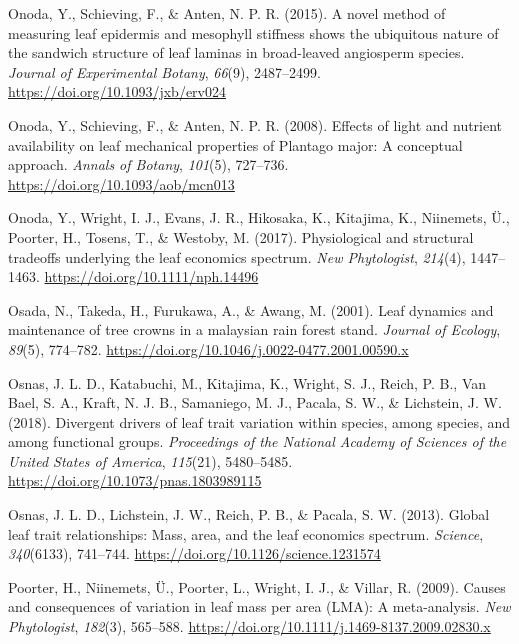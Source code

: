 \documentclass[
  12pt,
  a4paper,
,tablecaptionabove
]{scrartcl}
\newlength{\cslhangindent}
\newenvironment{CSLReferences}[2] %
 {%
  \setlength{\parindent}{0pt}
  \ifodd #1 \everypar{\setlength{\hangindent}{\cslhangindent}}\ignorespaces\fi
  \ifnum #2 > 0
  \setlength{\parskip}{#2\baselineskip}
  \fi
 }%
 {}
\begin{document}
\begin{CSLReferences}{1}{0}
\leavevmode{}%
Onoda, Y., Schieving, F., \& Anten, N. P. R. (2015). A novel method of
measuring leaf epidermis and mesophyll stiffness shows the ubiquitous
nature of the sandwich structure of leaf laminas in broad-leaved
angiosperm species. \emph{Journal of Experimental Botany}, \emph{66}(9),
2487--2499. \url{https://doi.org/10.1093/jxb/erv024}

\leavevmode{}%
Onoda, Y., Schieving, F., \& Anten, N. P. R. (2008). Effects of light
and nutrient availability on leaf mechanical properties of {Plantago}
major: {A} conceptual approach. \emph{Annals of Botany}, \emph{101}(5),
727--736. \url{https://doi.org/10.1093/aob/mcn013}

\leavevmode{}%
Onoda, Y., Wright, I. J., Evans, J. R., Hikosaka, K., Kitajima, K.,
Niinemets, Ü., Poorter, H., Tosens, T., \& Westoby, M. (2017).
Physiological and structural tradeoffs underlying the leaf economics
spectrum. \emph{New Phytologist}, \emph{214}(4), 1447--1463.
\url{https://doi.org/10.1111/nph.14496}

\leavevmode{}%
Osada, N., Takeda, H., Furukawa, A., \& Awang, M. (2001). Leaf dynamics
and maintenance of tree crowns in a malaysian rain forest stand.
\emph{Journal of Ecology}, \emph{89}(5), 774--782.
\url{https://doi.org/10.1046/j.0022-0477.2001.00590.x}

\leavevmode{}%
Osnas, J. L. D., Katabuchi, M., Kitajima, K., Wright, S. J., Reich, P.
B., Van Bael, S. A., Kraft, N. J. B., Samaniego, M. J., Pacala, S. W.,
\& Lichstein, J. W. (2018). Divergent drivers of leaf trait variation
within species, among species, and among functional groups.
\emph{Proceedings of the National Academy of Sciences of the United
States of America}, \emph{115}(21), 5480--5485.
\url{https://doi.org/10.1073/pnas.1803989115}

\leavevmode{}%
Osnas, J. L. D., Lichstein, J. W., Reich, P. B., \& Pacala, S. W.
(2013). Global leaf trait relationships: {Mass}, area, and the leaf
economics spectrum. \emph{Science}, \emph{340}(6133), 741--744.
\url{https://doi.org/10.1126/science.1231574}

\leavevmode{}%
Poorter, H., Niinemets, Ü., Poorter, L., Wright, I. J., \& Villar, R.
(2009). Causes and consequences of variation in leaf mass per area
({LMA}): {A} meta-analysis. \emph{New Phytologist}, \emph{182}(3),
565--588. \url{https://doi.org/10.1111/j.1469-8137.2009.02830.x}


\end{CSLReferences}
\end{document}
